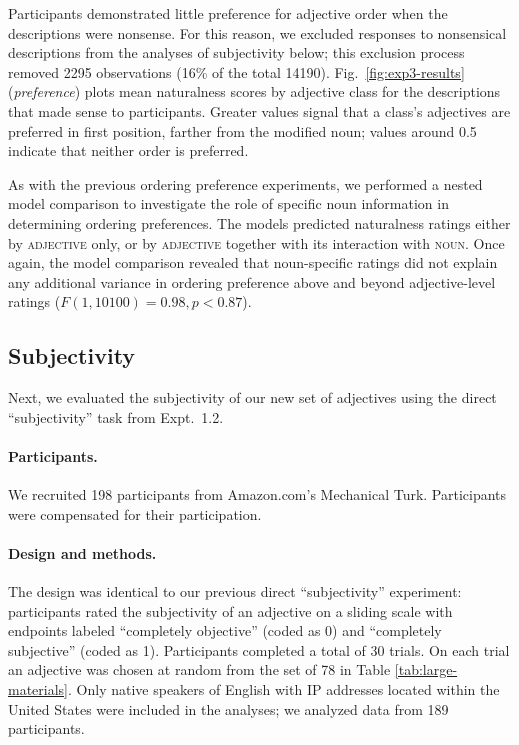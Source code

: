 \documentclass[12pt]{article}
\newcommand{\ndg}[1]{\textcolor{Green}{[ndg: #1]}}
\begin{document}
Participants demonstrated little preference for adjective order when the descriptions were nonsense. For this reason, we excluded responses to nonsensical descriptions from the analyses of subjectivity below; this exclusion process removed 2295 observations (16\% of the total 14190).  %
Fig.~\ref{fig:exp3-results} (\emph{preference}) plots mean naturalness scores by adjective class for the descriptions that made sense to participants. Greater values signal that a class's adjectives are preferred in first position, farther from the modified noun; values around 0.5 indicate that neither order is preferred. 

As with the previous ordering preference experiments, we performed a nested model comparison to investigate the role of specific noun information in determining ordering preferences. The models predicted naturalness ratings either by \textsc{adjective} only, or by \textsc{adjective} together with its interaction with \textsc{noun}. Once again, the model comparison revealed that noun-specific ratings did not explain any additional variance in ordering preference above and beyond adjective-level ratings ($F(1,10100) = 0.98, p < 0.87$).

\subsection{Subjectivity}

Next, we evaluated the subjectivity of our new set of adjectives using the direct ``subjectivity'' task from Expt.~1.2.

\paragraph{Participants.}

We recruited 198 participants from Amazon.com's Mechanical Turk. Participants were compensated for their participation.

\paragraph{Design and methods.}

The design was identical to our previous direct ``subjectivity'' experiment: participants rated the subjectivity of an adjective on a sliding scale with endpoints labeled ``completely objective'' (coded as 0) and ``completely subjective'' (coded as 1). Participants completed a total of 30 trials. On each trial an adjective was chosen at random from the set of 78 in Table \ref{tab:large-materials}.  Only native speakers of English with IP addresses located within the United States were included in the analyses; we analyzed data from 189 participants.
\end{document}
